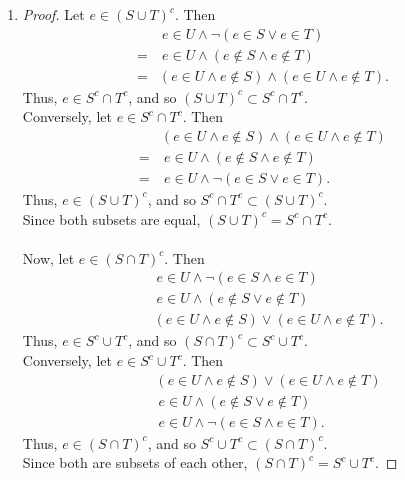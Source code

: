\documentclass{homework}
\begin{document}
\begin{solution}
\begin{enumerate}[label=(\alph*)]
  \item 
    \begin{proof}[Proof]
        Let $e\in \left( S\cup T \right) ^{c}$. Then 
        \begin{align*}
          &~e\in U\land \neg \left( e \in S\lor e\in T\right) \\
          = &~e\in U\land \left( e\not\in S\land  e\not\in T \right) \\
          = &\left( e\in U\land e\not\in S\right) \land \left( e\in U\land e\not\in T \right) 
        .\end{align*}
        Thus, $e\in S^{c}\cap T^{c}$, and so $\left( S\cup T \right) ^{c}\subset S^{c}\cap T^{c}$.\\
        Conversely, let $e\in S^{c}\cap T^{c}$. Then
        \begin{align*}
          &\left( e\in U\land e\not\in S \right) \land \left(  e\in U\land e\not\in T \right)\\
          =&~e\in U\land \left( e\not\in S\land e\not\in T \right) \\
          =&~e\in U\land \neg \left(  e\in S\lor e\in T\right) 
        .\end{align*}
      Thus, $e\in \left( S\cup T \right) ^{c}$, and so $S^{c}\cap T^{c}\subset \left( S\cup T 
      \right) ^{c}$.\\
      Since both subsets are equal, $\left( S\cup T \right) ^{c}=S^{c}\cap T^{c}$. \\ \\
      Now, let $e\in \left( S\cap T \right) ^{c}$. Then 
      \begin{align*}
        &~e\in U\land \neg \left( e\in S\land e\in T \right) \\
        &~e\in U\land \left( e\not\in S\lor e\not\in T \right) \\
        &\left( e\in U\land e\not\in S \right) \lor \left( e\in U\land e\not\in T \right) 
      .\end{align*}
      Thus, $e\in S^{c}\cup T^{c}$, and so $\left( S\cap T\right) ^{c} \subset S^{c}\cup T^{c}$.\\
      Conversely, let $e\in S^{c}\cup T^{c}$. Then 
      \begin{align*}
        &\left( e\in U\land e\not\in S \right) \lor \left( e\in U\land e\not\in T \right)\\
        &~e\in U \land \left( e\not\in S\lor e\not\in T \right) \\
        &~e\in U\land \neg \left( e\in S\land e\in T \right)
      .\end{align*}
      Thus, $e\in \left( S\cap T \right) ^{c}$, and so $S^{c}\cup T^{c}\subset \left( S\cap 
      T \right) ^{c}$.\\
      Since both are subsets of each other, $\left( S\cap T \right) ^{c}=S^{c}\cup T^{c}$.
    \end{proof}



\end{enumerate}
\end{solution}
\end{document}
